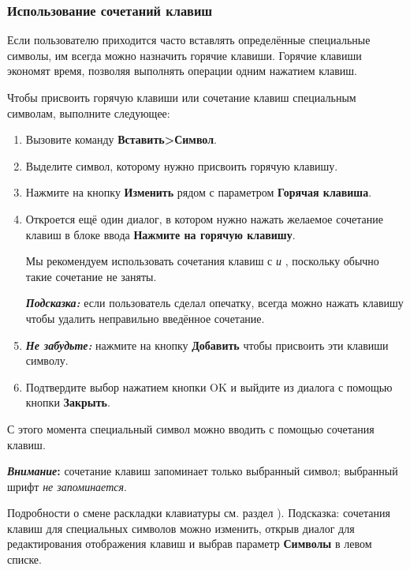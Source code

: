 ﻿\documentclass[a4paper,10pt]{article}
\begin{document}
\subsubsection{Использование сочетаний клавиш}
Если пользователю приходится часто вставлять определённые специальные символы, им всегда можно назначить горячие клавиши. Горячие клавиши экономят время, позволяя выполнять операции одним нажатием клавиш.

Чтобы присвоить горячую клавиши или сочетание клавиш специальным символам, выполните следующее:
\begin{enumerate}
 \item Вызовите команду \textbf{Вставить>Символ}.
 \item Выделите символ, которому нужно присвоить горячую клавишу.
 \item Нажмите на кнопку \textbf{Изменить} рядом с параметром \textbf{Горячая клавиша}.
 \item Откроется ещё один диалог, в котором нужно нажать желаемое сочетание клавиш в блоке ввода \textbf{Нажмите на горячую клавишу}.


Мы рекомендуем использовать сочетания клавиш с  \textit{и} , поскольку обычно такие сочетание не заняты.

\textit{\textbf{Подсказка:}} если пользователь сделал опечатку, всегда можно нажать клавишу  чтобы удалить неправильно введённое сочетание.

\item \textit{\textbf{Не забудьте:}} нажмите на кнопку \textbf{Добавить} чтобы присвоить эти клавиши символу.
\item Подтвердите выбор нажатием кнопки OK и выйдите из диалога с помощью кнопки \textbf{Закрыть}.
\end{enumerate}

С этого момента специальный символ можно вводить с помощью сочетания клавиш.

\begin{mdframed}[backgroundcolor=blue!10]
\textbf{\textit{Внимание}:} сочетание клавиш запоминает только выбранный символ; выбранный шрифт \textit{не запоминается}.
\end{mdframed}

Подробности о смене раскладки клавиатуры см. раздел ). Подсказка: сочетания клавиш для специальных символов можно изменить, открыв диалог для редактирования отображения клавиш и выбрав параметр \textbf{Символы} в левом списке.
\end{document}
